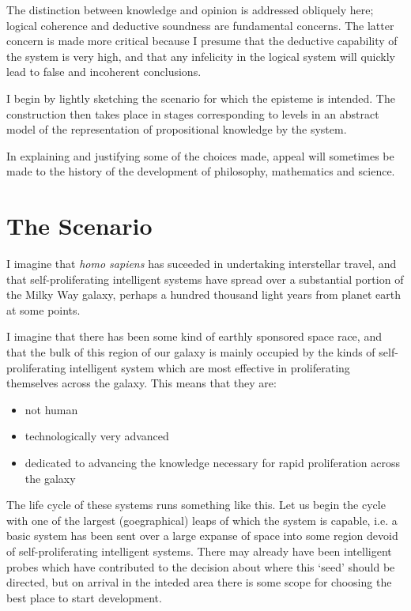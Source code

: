 \documentclass[10pt,titlepage]{article}
\begin{document}
The distinction between knowledge and opinion is addressed obliquely here; logical coherence and deductive soundness are fundamental concerns.
The latter concern is made more critical because I presume that the deductive capability of the system is very high, and that any infelicity in the logical system will quickly lead to false and incoherent conclusions.

I begin by lightly sketching the scenario for which the episteme is intended.
The construction then takes place in stages corresponding to levels in an abstract model of the representation of propositional knowledge by the system.

In explaining and justifying some of the choices made, appeal will sometimes be made to the history of the development of philosophy, mathematics and science.

\section{The Scenario}

I imagine that \emph{homo sapiens} has suceeded in undertaking interstellar travel, and that self-proliferating intelligent systems have spread over a substantial portion of the Milky Way galaxy, perhaps a hundred thousand light years from planet earth at some points.

I imagine that there has been some kind of earthly sponsored space race, and that the bulk of this region of our galaxy is mainly occupied by the kinds of self-proliferating intelligent system which are most effective in proliferating themselves across the galaxy.
This means that they are:
\begin{itemize}
\item not human
\item technologically very advanced
\item dedicated to advancing the knowledge necessary for rapid proliferation across the galaxy
\end{itemize}

The life cycle of these systems runs something like this.
Let us begin the cycle with one of the largest (goegraphical) leaps of which the system is capable, i.e. a basic system has been sent over a large expanse of space into some region devoid of self-proliferating intelligent systems.
There may already have been intelligent probes which have contributed to the decision about where this `seed' should be directed, but on arrival in the inteded area there is some scope for choosing the best place to start development.
\end{document}
